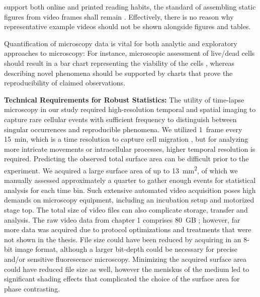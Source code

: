  support both online and printed reading habits, the standard of
assembling static figures from video frames shall remain
\cite{perasDigitalPaperReading2023}. Effectively, there is no reason why representative
example videos should not be shown alongside figures and tables. 

%
\label{sec:discussion_potential_breakthroughs}%
Quantification of microscopy data is vital for both analytic and exploratory
approaches to microscopy: For instance, microscopic assessment of live/dead
cells should result in a bar chart representing the viability of the cells
\cite{spaepenDigitalImageProcessing2011}, whereas describing novel phenomena
should be supported by charts that prove the reproducibility of claimed
observations. 


\textbf{Technical Requirements for Robust Statistics:} The utility of time-lapse
microscopy in our study required high-resolution temporal and spatial imaging to
capture rare cellular events with sufficient frequency to distinguish between
singular occurrences and reproducible phenomena. We utilized \SI{1}{frame} every
\SI{15}{\minute}, which is a  time resolution to capture cell migration
\cite{huthSignificantlyImprovedPrecision2010}, but for analyzing more intricate
movements or intracellular processes, higher temporal resolution is required.
Predicting the observed total surface area can be difficult prior to the
experiment. We acquired a large surface area of up to
\SI{13}{\milli\meter\squared}, of which we manually assessed approximately a
quarter to gather enough events for statistical analysis for each time bin. Such
extensive automated video acquisition poses high demands on microscopy
equipment, including an incubation setup and motorized stage top. The total size
of video files can also complicate storage, transfer and analysis. The raw video
data from chapter 1 comprises \SI{80}{GB}
\cite{biostudiesBioStudiesEuropeanBioinformatics}; however, far more data was
acquired due to protocol optimizations and treatments that were not shown in the
thesis. File size could have been reduced by acquiring in an 8-bit image format,
although a larger bit-depth could be necessary for precise and/or sensitive
fluorescence microscopy. Minimizing the acquired surface area could have reduced
file size as well, however the meniskus of the medium led to significant shading
effects that complicated the choice of the surface area for phase contrasting.



